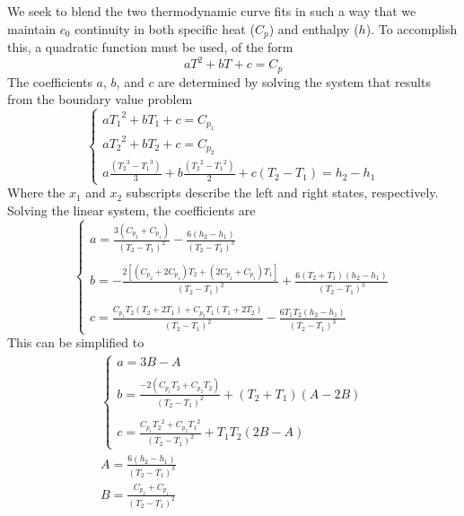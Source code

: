 We seek to blend the two thermodynamic curve fits in such a way that we maintain
$c_0$ continuity in both specific heat ($C_p$) and enthalpy ($h$).  To
accomplish this, a quadratic function must be used, of the form
\begin{equation}
  a T^2 + b T + c = C_p
  \label{generic_form}
\end{equation}
The coefficients $a$, $b$, and $c$ are determined by solving the system that
results from the boundary value problem
\begin{equation}
  \begin{cases}
    a {T_1}^{2} + b T_1 +c = C_{p_1} \\
    a {T_2}^{2} + b T_2 +c = C_{p_2} \\
    a \frac{\left( {T_2}^{3} - {T_1}^{3}\right) }{3} + b\frac{ \left( {T_2}^{2} - {T_1}^{2}\right) }{2} + c \left( T_2 - T_1\right) = h_2-h_1
  \end{cases}
\end{equation}
Where the $x_1$ and $x_2$ subscripts describe the left and right states,
respectively.  Solving the linear system, the coefficients are
\begin{equation}
  \begin{cases}
    a=\frac{3\left( C_{p_2}+ C_{p_1}\right) }{(T_2-T_1)^{2}} - \frac{6 \left(h_2 - h_1\right)}{(T_2-T_1)^{3}}\\ \\
    b=-\frac{2\left[(C_{p_2} + 2C_{p_1})T_2 + (2C_{p_2} + C_{p_1})T_1\right]}{(T_2-T_1)^{2}} + \frac{6(T_2+T_1)(h_2 - h_1)}{(T_2 - T_1)^3}\\ \\
    c=\frac{C_{p_1} T_2 (T_2 + 2T_1) + C_{p_2} T_1 (T_1 + 2 T_2)}{(T_2-T_1)^2} - \frac{6 T_1 T_2 (h_2 - h_1)}{(T_2 - T_1)^3}
  \end{cases}
\end{equation}
This can be simplified to
\begin{gather}
  \begin{cases}
    a=3B - A \\ \\
    b=\frac{-2(C_{p_1} T_2 + C_{p_2}T_2)}{(T_2 - T_1)^2} +(T_2+T_1) (A - 2B) \\ \\
    c=\frac{C_{p_1} {T_2}^2 + C_{p_2} {T_1}^2}{(T_2-T_1)^2} + T_1 T_2 (2B - A)
  \end{cases} \\
  A = \frac{6(h_2 - h_1)}{(T_2 - T_1)^3} \\
  B = \frac{C_{p_2} + C_{p_1}}{(T_2 - T_1)^2}
\end{gather}
